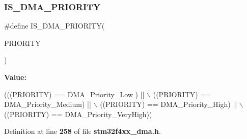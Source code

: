 \mbox{\label{group__DMA__priority__level_gaa1cae2ab458948511596467c87cd02b6}} 
\subsubsection{I\+S\+\_\+\+D\+M\+A\+\_\+\+P\+R\+I\+O\+R\+I\+TY}
{\footnotesize\ttfamily \#define I\+S\+\_\+\+D\+M\+A\+\_\+\+P\+R\+I\+O\+R\+I\+TY(\begin{DoxyParamCaption}\item[{}]{P\+R\+I\+O\+R\+I\+TY }\end{DoxyParamCaption})}

{\bfseries Value\+:}
\begin{DoxyCode}
(((PRIORITY) == DMA_Priority_Low )   || \(\backslash\)
                                   ((PRIORITY) == DMA_Priority_Medium) || \(\backslash\)
                                   ((PRIORITY) == DMA_Priority_High)   || \(\backslash\)
                                   ((PRIORITY) == DMA_Priority_VeryHigh))
\end{DoxyCode}


Definition at line \textbf{ 258} of file \textbf{ stm32f4xx\+\_\+dma.\+h}.

